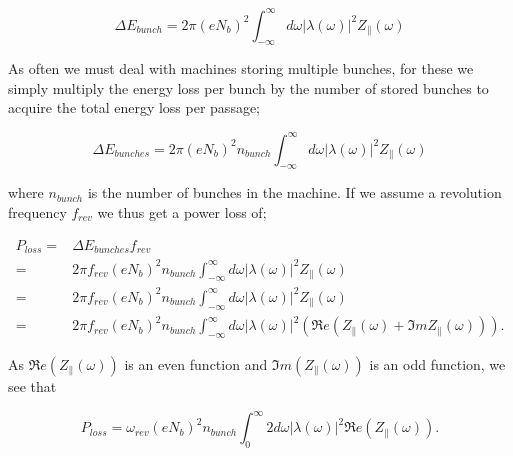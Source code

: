 \begin{equation}
\Delta E_{bunch} = 2\pi \left( eN_{b}   \right)^{2} \int^{\infty}_{-\infty} d\omega \left| \lambda \left( \omega \right)  \right|^{2} Z_{\parallel} \left( \omega \right)
\end{equation}

As often we must deal with machines storing multiple bunches, for these we simply multiply the energy loss per bunch by the number of stored bunches to acquire the total energy loss per passage;

\begin{equation}
\Delta E_{bunches} = 2\pi \left( eN_{b}   \right)^{2}n_{bunch} \int^{\infty}_{-\infty} d\omega \left| \lambda \left( \omega \right)  \right|^{2} Z_{\parallel} \left( \omega \right)
\end{equation}

where $n_{bunch}$ is the number of bunches in the machine. If we assume a revolution frequency $f_{rev}$ we thus get a power loss of;

\begin{align}
P_{loss}  = & \Delta E_{bunches} f_{rev}\nonumber \\  
 = & 2\pi f_{rev} \left( eN_{b}   \right)^{2}n_{bunch} \int^{\infty}_{-\infty} d\omega \left| \lambda \left( \omega \right)  \right|^{2} Z_{\parallel} \left( \omega \right) \nonumber  \\ 
 = & 2\pi f_{rev} \left( eN_{b}   \right)^{2}n_{bunch} \int^{\infty}_{-\infty} d\omega \left| \lambda \left( \omega \right)  \right|^{2} Z_{\parallel} \left( \omega \right) \nonumber \\
 = & 2\pi f_{rev} \left( eN_{b}   \right)^{2}n_{bunch} \int^{\infty}_{-\infty} d\omega \left| \lambda \left( \omega \right)  \right|^{2} \left( \Re{}e \left( Z_{\parallel} \left( \omega\right) + \Im{}m Z_{\parallel} \left( \omega\right) \right) \right).
\end{align}
 
As $\Re{}e\left(Z_{\parallel} \left( \omega\right)\right)$ is an even function and $\Im{}m\left(Z_{\parallel} \left( \omega\right)\right)$ is an odd function, we see that

\begin{equation}
P_{loss}   =  \omega_{rev} \left( eN_{b}   \right)^{2}n_{bunch} \int^{\infty}_{0} 2 d\omega \left| \lambda \left( \omega \right)  \right| ^{2}  \Re{}e \left( Z_{\parallel} \left( \omega\right)  \right).
\label{eqn:power_loss_omega}
\end{equation}


